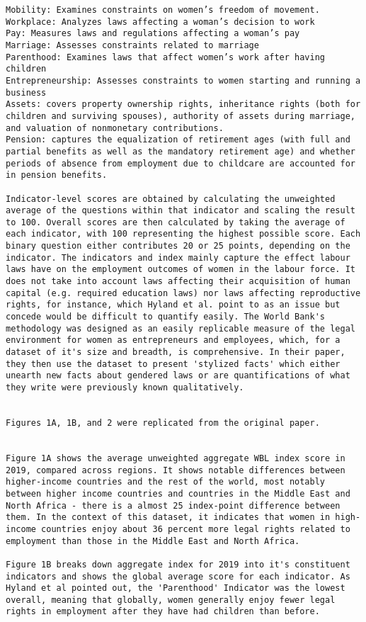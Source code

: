 \documentclass[
  letterpaper,
  DIV=11,
  numbers=noendperiod]{scrartcl}
\begin{document}
\begin{verbatim}
Mobility: Examines constraints on women’s freedom of movement. 
Workplace: Analyzes laws affecting a woman’s decision to work
Pay: Measures laws and regulations affecting a woman’s pay
Marriage: Assesses constraints related to marriage
Parenthood: Examines laws that affect women’s work after having children
Entrepreneurship: Assesses constraints to women starting and running a business
Assets: covers property ownership rights, inheritance rights (both for children and surviving spouses), authority of assets during marriage, and valuation of nonmonetary contributions. 
Pension: captures the equalization of retirement ages (with full and partial benefits as well as the mandatory retirement age) and whether periods of absence from employment due to childcare are accounted for in pension benefits. 

Indicator-level scores are obtained by calculating the unweighted average of the questions within that indicator and scaling the result to 100. Overall scores are then calculated by taking the average of each indicator, with 100 representing the highest possible score. Each binary question either contributes 20 or 25 points, depending on the indicator. The indicators and index mainly capture the effect labour laws have on the employment outcomes of women in the labour force. It does not take into account laws affecting their acquisition of human capital (e.g. required education laws) nor laws affecting reproductive rights, for instance, which Hyland et al. point to as an issue but concede would be difficult to quantify easily. The World Bank's methodology was designed as an easily replicable measure of the legal environment for women as entrepreneurs and employees, which, for a dataset of it's size and breadth, is comprehensive. In their paper, they then use the dataset to present 'stylized facts' which either unearth new facts about gendered laws or are quantifications of what they write were previously known qualitatively. 


Figures 1A, 1B, and 2 were replicated from the original paper. 


Figure 1A shows the average unweighted aggregate WBL index score in 2019, compared across regions. It shows notable differences between higher-income countries and the rest of the world, most notably between higher income countries and countries in the Middle East and North Africa - there is a almost 25 index-point difference between them. In the context of this dataset, it indicates that women in high-income countries enjoy about 36 percent more legal rights related to employment than those in the Middle East and North Africa. 

Figure 1B breaks down aggregate index for 2019 into it's constituent indicators and shows the global average score for each indicator. As Hyland et al pointed out, the 'Parenthood' Indicator was the lowest overall, meaning that globally, women generally enjoy fewer legal rights in employment after they have had children than before. 
\end{verbatim}
\end{document}

